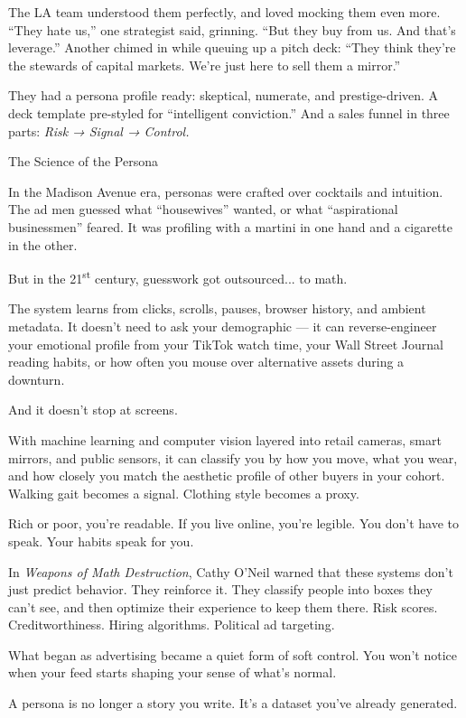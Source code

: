 The LA team understood them perfectly, and loved mocking them even more.
``They hate us,'' one strategist said, grinning. ``But they buy from us. And that’s leverage.''
Another chimed in while queuing up a pitch deck:
``They think they’re the stewards of capital markets. We’re just here to sell them a mirror.''

They had a persona profile ready: skeptical, numerate, and prestige-driven.
A deck template pre-styled for ``intelligent conviction.''
And a sales funnel in three parts:
\textit{Risk → Signal → Control.}

\medskip

\begin{HistoricalSidebar}{The Science of the Persona}

  In the Madison Avenue era, personas were crafted over cocktails and intuition.  
  The ad men guessed what “housewives” wanted, or what “aspirational businessmen” feared.  
  It was profiling with a martini in one hand and a cigarette in the other.

  \medskip
  
  But in the 21\textsuperscript{st} century, guesswork got outsourced... to math.
  
  \medskip
  
  The system learns from clicks, scrolls, pauses, browser history, and ambient metadata.  
  It doesn’t need to ask your demographic — it can reverse-engineer your emotional profile from your TikTok watch time,  
  your Wall Street Journal reading habits, or how often you mouse over alternative assets during a downturn.

  \medskip
  
  And it doesn’t stop at screens.

  \medskip
  
  With machine learning and computer vision layered into retail cameras, smart mirrors, and public sensors,  
  it can classify you by how you move, what you wear, and how closely you match the aesthetic profile of other buyers 
  in your cohort.  
  Walking gait becomes a signal. Clothing style becomes a proxy.

  \medskip
  
  Rich or poor, you’re readable.  
  If you live online, you’re legible.  
  You don’t have to speak. Your habits speak for you.
  
  \medskip
  
  In \textit{Weapons of Math Destruction}, Cathy O’Neil warned that these systems don’t just predict behavior.  
  They reinforce it. They classify people into boxes they can’t see, and then optimize their experience  
  to keep them there. Risk scores. Creditworthiness. Hiring algorithms. Political ad targeting.
  
  \medskip
  
  What began as advertising became a quiet form of soft control.  You won’t notice when your feed starts 
  shaping your sense of what’s normal.
  
  \medskip
  
  A persona is no longer a story you write.  
  It’s a dataset you’ve already generated.
  
\end{HistoricalSidebar}
  

